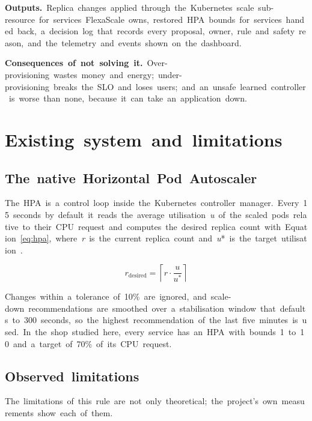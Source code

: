\documentclass[12pt,a4paper,oneside]{report}
\begin{document}
\textbf{Outputs.}~Replica~changes~applied~through~the~Kubernetes~scale~sub-resource~for~services~FlexaScale~owns,~restored~HPA~bounds~for~services~handed~back,~a~decision~log~that~records~every~proposal,~owner,~rule~and~safety~reason,~and~the~telemetry~and~events~shown~on~the~dashboard.


\textbf{Consequences~of~not~solving~it.}~Over-provisioning~wastes~money~and~energy;~under-provisioning~breaks~the~SLO~and~loses~users;~and~an~unsafe~learned~controller~is~worse~than~none,~because~it~can~take~an~application~down.


\section{Existing~system~and~limitations}

\subsection{The~native~Horizontal~Pod~Autoscaler}

The~HPA~is~a~control~loop~inside~the~Kubernetes~controller~manager.~Every~15~seconds~by~default~it~reads~the~average~utilisation~\textit{u}~of~the~scaled~pods~relative~to~their~CPU~request~and~computes~the~desired~replica~count~with~Equation~\ref{eq:hpa},~where~\textit{r}~is~the~current~replica~count~and~\textit{u}*~is~the~target~utilisation~\cite{k8shpa}.


\begin{equation}\label{eq:hpa}
r_{\mathrm{desired}} = \left\lceil r \cdot \frac{u}{u^{*}} \right\rceil
\end{equation}

Changes~within~a~tolerance~of~10\%~are~ignored,~and~scale-down~recommendations~are~smoothed~over~a~stabilisation~window~that~defaults~to~300~seconds,~so~the~highest~recommendation~of~the~last~five~minutes~is~used.~In~the~shop~studied~here,~every~service~has~an~HPA~with~bounds~1~to~10~and~a~target~of~70\%~of~its~CPU~request.


\subsection{Observed~limitations}

The~limitations~of~this~rule~are~not~only~theoretical;~the~project's~own~measurements~show~each~of~them.
\end{document}
